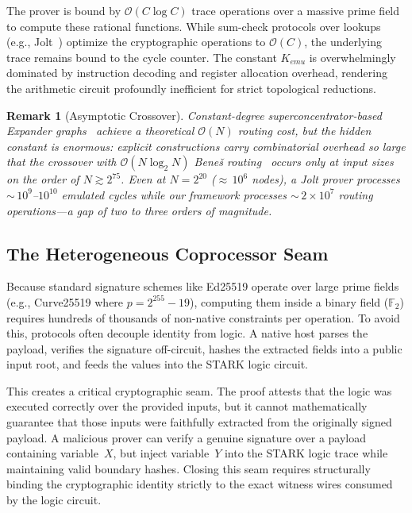 \documentclass[11pt,a4paper]{article}
\newtheorem{remark}[theorem]{Remark}
\begin{document}
The prover is bound by $\mathcal{O}(C \log C)$ trace operations
over a massive prime field to compute these rational functions.
While sum-check protocols over lookups
(e.g., Jolt~\cite{jolt}) optimize the
cryptographic operations to $\mathcal{O}(C)$, the underlying trace
remains bound to the cycle counter.  The constant $K_{emu}$ is
overwhelmingly dominated by instruction decoding and register
allocation overhead, rendering the arithmetic circuit profoundly
inefficient for strict topological reductions.

\begin{remark}[Asymptotic Crossover]\label{rem:crossover}
Constant-degree superconcentrator-based Expander
graphs~\cite{valiant} achieve a theoretical $\mathcal{O}(N)$ routing
cost, but the hidden constant is enormous: explicit constructions
carry combinatorial overhead so large that the crossover with
$\mathcal{O}(N \log_2 N)$ Bene\v{s}
routing~\cite{benes} occurs only at input sizes on the order of
$N \gtrsim 2^{75}$.  Even at $N = 2^{20}$
(${\approx}\,10^6$ nodes), a Jolt prover processes
${\sim}\,10^{9}$--$10^{10}$ emulated cycles while our framework
processes ${\sim}\,2 \times 10^{7}$ routing operations---a gap of
two to three orders of magnitude.
\end{remark}

\subsection{The Heterogeneous Coprocessor Seam}

Because standard signature schemes like Ed25519 operate over large
prime fields (e.g., Curve25519 where $p = 2^{255} - 19$), computing
them inside a binary field ($\mathbb{F}_2$) requires hundreds of
thousands of non-native constraints per operation.  To avoid this,
protocols often decouple identity from logic.  A native host parses
the payload, verifies the signature off-circuit, hashes the
extracted fields into a public input root, and feeds the values into
the STARK logic circuit.

This creates a critical cryptographic seam.  The proof attests that
the logic was executed correctly over the provided inputs, but it
cannot mathematically guarantee that those inputs were faithfully
extracted from the originally signed payload.  A malicious prover
can verify a genuine signature over a payload containing variable~$X$,
but inject variable~$Y$ into the STARK logic trace while maintaining
valid boundary hashes.  Closing this seam requires structurally
binding the cryptographic identity strictly to the exact witness
wires consumed by the logic circuit.
\end{document}
